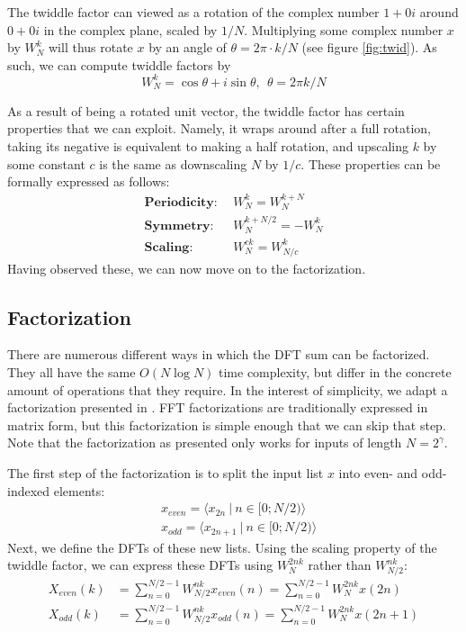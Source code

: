 The twiddle factor can viewed as a rotation of the complex number $1 + 0i$
around $0 + 0i$ in the complex plane, scaled by $1/N$.
Multiplying some complex number $x$ by $W_N^k$
will thus rotate $x$ by an angle of $\theta = 2 \pi \cdot k/N$ (see figure \ref{fig:twid}).
As such, we can compute twiddle factors by
\begin{equation}
    W_N^k = \cos \theta + i \sin \theta,~~\theta = 2\pi k/N
\end{equation}

As a result of being a rotated unit vector,
the twiddle factor has certain properties that we can exploit.
Namely, it wraps around after a full rotation,
taking its negative is equivalent to making a half rotation,
and upscaling $k$ by some constant $c$ is the same as downscaling $N$ by $1/c$.
These properties can be formally expressed as follows:
\begin{align}
    \textbf{Periodicity:} &~~W^k_N = W^{k + N}_N\\
    \textbf{Symmetry:}    &~~W^{k + N/2}_N = -W^k_N\\
    \textbf{Scaling:}     &~~W_N^{ck} = W_{N/c}^{k}
\end{align}
Having observed these, we can now move on to the factorization.

\subsection{Factorization}
There are numerous different ways in which the DFT sum can be factorized.
They all have the same $O(N \log N)$ time complexity,
but differ in the concrete amount of operations that they require.
In the interest of simplicity,
we adapt a factorization presented in \cite{brunton}.
FFT factorizations are traditionally expressed in matrix form,
but this factorization is simple enough that we can skip that step.
Note that the factorization as presented only works for inputs of length $N = 2^\gamma$.

The first step of the factorization
is to split the input list $x$ into even- and odd-indexed elements:
\begin{align}
    &x_\textit{even} = \langle x_{2n} ~|~ n \in [0; N/2) \rangle\\
    &x_\textit{odd}  = \langle x_{2n + 1} ~|~ n \in [0; N/2) \rangle
\end{align}
%
Next, we define the DFTs of these new lists.
Using the scaling property of the twiddle factor,
we can express these DFTs using $W_N^{2nk}$ rather than $W_{N/2}^{nk}$:
\begin{align}
    X_\textit{even}(k) &= \sum_{n = 0}^{N/2 - 1} W_{N/2}^{nk} x_\textit{even}(n) = \sum_{n = 0}^{N/2 - 1} W_{N}^{2nk} x(2n) \\
    X_\textit{odd}(k) &= \sum_{n = 0}^{N/2 - 1} W_{N/2}^{nk} x_\textit{odd}(n) = \sum_{n = 0}^{N/2 - 1} W_{N}^{2nk} x(2n + 1)
\end{align}

